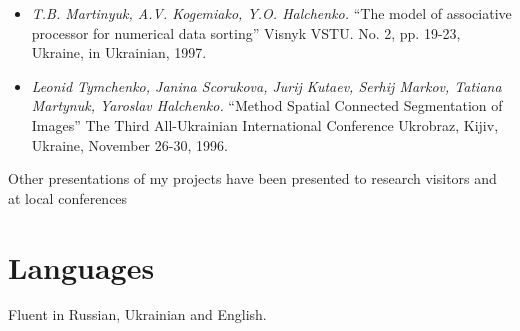 \documentclass[10pt,overlapped,line]{res}
\newcommand{\mtitle}[1]{``#1''}
\newcommand{\mauthors}[1]{ \textit{#1.}}
\newcommand{\mwhere}[1]{#1.}
\begin{document}
\begin{resume}
\begin{itemize}
   \item
     \mauthors{T.B. Martinyuk, A.V. Kogemiako, Y.O. Halchenko}
     \mtitle{The model of associative processor for numerical data sorting}
     \mwhere{ Visnyk VSTU. No. 2, pp. 19-23, Ukraine, in Ukrainian, 1997}

   \item
     \mauthors{Leonid Tymchenko, Janina Scorukova, Jurij Kutaev, Serhij Markov, Tatiana Martynuk, Yaroslav Halchenko}
     \mtitle{Method Spatial Connected Segmentation of Images}
     \mwhere{The Third All-Ukrainian International Conference Ukrobraz, Kijiv, Ukraine, November 26-30, 1996}
 \end{itemize}

 Other presentations of my projects have been presented to research visitors and at local conferences

 \section{Languages}
 Fluent in Russian, Ukrainian and English.



\end{resume}
\end{document}
